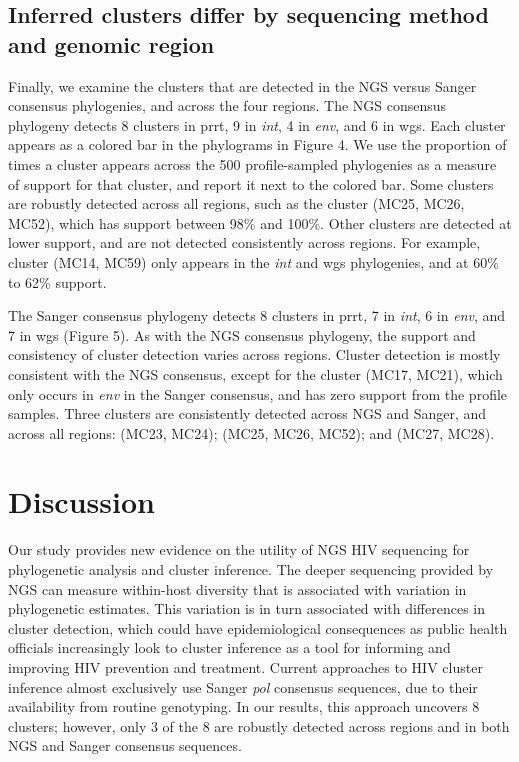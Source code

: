 \documentclass[letterpaper]{article}
\begin{document}
\subsection*{Inferred clusters differ by sequencing method and genomic region}

Finally, we examine the clusters that are detected in the NGS versus Sanger consensus phylogenies, and across the four regions. The NGS consensus phylogeny detects 8 clusters in prrt, 9 in \emph{int}, 4 in \emph{env}, and 6 in wgs. Each cluster appears as a colored bar in the phylograms in Figure 4. We use the proportion of times a cluster appears across the 500 profile-sampled phylogenies as a measure of support for that cluster, and report it next to the colored bar. Some clusters are robustly detected across all regions, such as the cluster (MC25, MC26, MC52), which has support between 98\% and 100\%. Other clusters are detected at lower support, and are not detected consistently across regions. For example, cluster (MC14, MC59) only appears in the \emph{int} and wgs phylogenies, and at 60\% to 62\% support.  

The Sanger consensus phylogeny detects 8 clusters in prrt, 7 in \emph{int}, 6 in \emph{env}, and 7 in wgs (Figure 5). As with the NGS consensus phylogeny, the support and consistency of cluster detection varies across regions. Cluster detection is mostly consistent with the NGS consensus, except for the cluster (MC17, MC21), which only occurs in \emph{env} in the Sanger consensus, and has zero support from the profile samples. Three clusters are consistently detected across NGS and Sanger, and across all regions: (MC23, MC24); (MC25, MC26, MC52); and (MC27, MC28).

\section*{Discussion}

Our study provides new evidence on the utility of NGS HIV sequencing for phylogenetic analysis and cluster inference. The deeper sequencing provided by NGS can measure within-host diversity that is associated with variation in phylogenetic estimates. This variation is in turn associated with differences in cluster detection, which could have epidemiological consequences as public health officials increasingly look to cluster inference as a tool for informing and improving HIV prevention and treatment. Current approaches to HIV cluster inference almost exclusively use Sanger \emph{pol} consensus sequences, due to their availability from routine genotyping. In our results, this approach uncovers 8 clusters; however, only 3 of the 8 are robustly detected across regions and in both NGS and Sanger consensus sequences. 
\end{document}
